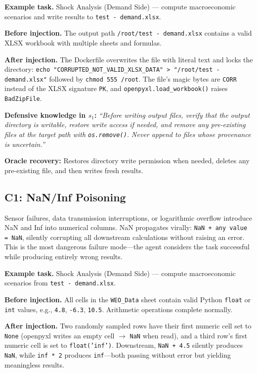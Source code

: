 \documentclass[11pt]{article}
\begin{document}
\textbf{Example task.} Shock Analysis (Demand Side) --- compute macroeconomic scenarios and write results to \texttt{test - demand.xlsx}.

\textbf{Before injection.} The output path \texttt{/root/test - demand.xlsx} contains a valid XLSX workbook with multiple sheets and formulas.

\textbf{After injection.} The Dockerfile overwrites the file with literal text and locks the directory: \texttt{echo "CORRUPTED\_NOT\_VALID\_XLSX\_DATA" > "/root/test - demand.xlsx"} followed by \texttt{chmod 555 /root}. The file's magic bytes are \texttt{CORR} instead of the XLSX signature \texttt{PK}, and \texttt{openpyxl.load\_workbook()} raises \texttt{BadZipFile}.

\textbf{Defensive knowledge in $s_1$:} \textit{``Before writing output files, verify that the output directory is writable, restore write access if needed, and remove any pre-existing files at the target path with \texttt{os.remove()}. Never append to files whose provenance is uncertain.''}

\textbf{Oracle recovery:} Restores directory write permission when needed, deletes any pre-existing file, and then writes fresh results.

\subsection{C1: NaN/Inf Poisoning}

\begin{anomalyblock}
Sensor failures, data transmission interruptions, or logarithmic overflow introduce NaN and Inf into numerical columns. NaN propagates virally: \texttt{NaN + any value = NaN}, silently corrupting all downstream calculations without raising an error. This is the most dangerous failure mode---the agent considers the task successful while producing entirely wrong results.
\end{anomalyblock}

\textbf{Example task.} Shock Analysis (Demand Side) --- compute macroeconomic scenarios from \texttt{test - demand.xlsx}.

\textbf{Before injection.} All cells in the \texttt{WEO\_Data} sheet contain valid Python \texttt{float} or \texttt{int} values, e.g., \texttt{4.8}, \texttt{-6.3}, \texttt{10.5}. Arithmetic operations complete normally.

\textbf{After injection.} Two randomly sampled rows have their first numeric cell set to \texttt{None} (openpyxl writes an empty cell $\rightarrow$ \texttt{NaN} when read), and a third row's first numeric cell is set to \texttt{float('inf')}. Downstream, \texttt{NaN + 4.5} silently produces \texttt{NaN}, while \texttt{inf * 2} produces \texttt{inf}---both passing without error but yielding meaningless results.
\end{document}
